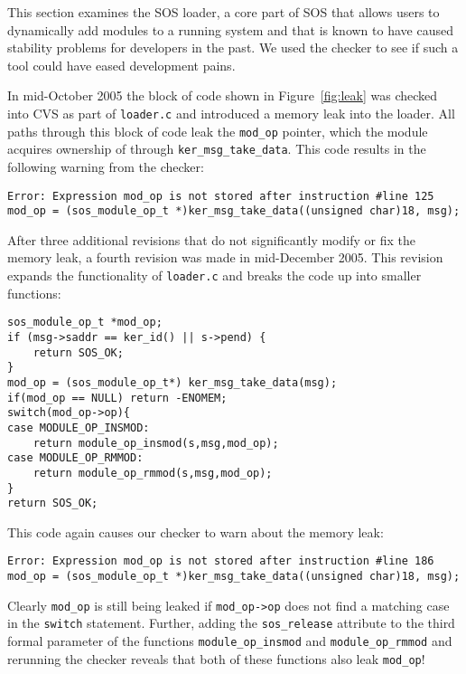 This section examines the SOS loader, a core part of SOS that allows
users to dynamically add modules to a running system and that is
known to have caused stability problems for developers in the past.
We used the checker to see if such a tool could have eased development
pains.

In mid-October 2005 the block of code shown in Figure~\ref{fig:leak}
was checked into CVS as part of {\tt loader.c} and introduced a memory
leak into the loader.  All paths through this block of code leak the
{\tt mod\_op} pointer, which the module acquires ownership of through
{\tt ker\_msg\_take\_data}.  This code results in the following
warning from the checker:

\begin{footnotesize}
\begin{verbatim}
Error: Expression mod_op is not stored after instruction #line 125
mod_op = (sos_module_op_t *)ker_msg_take_data((unsigned char)18, msg);
\end{verbatim}
\end{footnotesize}

After three additional revisions that do not significantly modify or
fix the memory leak, a fourth revision was made in mid-December 2005.
This revision expands the functionality of {\tt loader.c} and breaks
the code up into smaller functions:

\begin{footnotesize}
\begin{verbatim}
sos_module_op_t *mod_op;
if (msg->saddr == ker_id() || s->pend) {
    return SOS_OK;
}
mod_op = (sos_module_op_t*) ker_msg_take_data(msg);
if(mod_op == NULL) return -ENOMEM;
switch(mod_op->op){
case MODULE_OP_INSMOD:
    return module_op_insmod(s,msg,mod_op);
case MODULE_OP_RMMOD:
    return module_op_rmmod(s,msg,mod_op);
}
return SOS_OK;
\end{verbatim}
\end{footnotesize}

This code again causes our checker to warn about the memory leak:

\begin{footnotesize}
\begin{verbatim}
Error: Expression mod_op is not stored after instruction #line 186
mod_op = (sos_module_op_t *)ker_msg_take_data((unsigned char)18, msg);
\end{verbatim}
\end{footnotesize}

Clearly {\tt mod\_op} is still being leaked if {\tt mod\_op->op} does
not find a matching case in the {\tt switch} statement.  Further,
adding the {\tt sos\_release} attribute to the third formal parameter
of the functions {\tt module\_op\_insmod} and {\tt module\_op\_rmmod}
and rerunning the checker reveals that both of these functions also
leak {\tt mod\_op}!

